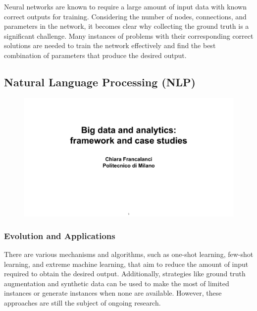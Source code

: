 Neural networks are known to require a large amount of input data with
known correct outputs for training. Considering the number of nodes,
connections, and parameters in the network, it becomes clear why
collecting the ground truth is a significant challenge. Many instances
of problems with their corresponding correct solutions are needed to
train the network effectively and find the best combination of
parameters that produce the desired output.


\subsection{Natural Language Processing
    (NLP)}\label{natural-language-processing-nlp}

\begin{figure}[!h]
    \centering
    \includegraphics[page=10, trim = 1.5cm 5cm 1.5cm 4cm, clip, width=\textwidth]{images/06 - BIG_DATA.pdf}
\end{figure}

\subsubsection{Evolution and
    Applications}\label{evolution-and-applications}

There are various mechanisms and algorithms, such as one-shot learning,
few-shot learning, and extreme machine learning, that aim to reduce the
amount of input required to obtain the desired output. Additionally,
strategies like ground truth augmentation and synthetic data can be used
to make the most of limited instances or generate instances when none
are available. However, these approaches are still the subject of
ongoing research.

